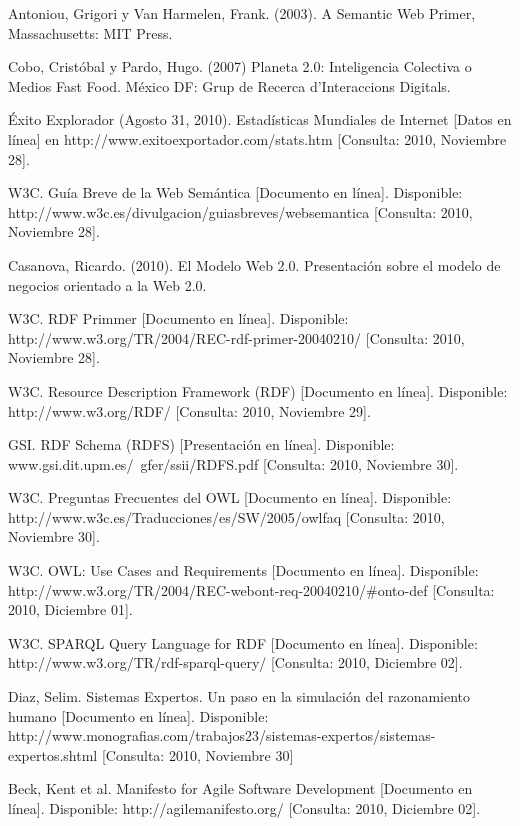 \begin{thebibliography}{20}

 Antoniou, Grigori y Van Harmelen, Frank. (2003). A Semantic Web Primer, Massachusetts: MIT Press.

 Cobo, Cristóbal y Pardo, Hugo. (2007) Planeta 2.0: Inteligencia Colectiva o Medios Fast Food. México DF: Grup de Recerca d'Interaccions Digitals.

 Éxito Explorador (Agosto 31, 2010). Estadísticas Mundiales de Internet [Datos en línea] en http://www.exitoexportador.com/stats.htm [Consulta: 2010, Noviembre 28].

 W3C. Guía Breve de la Web Semántica [Documento en línea]. Disponible: http://www.w3c.es/divulgacion/guiasbreves/websemantica [Consulta: 2010, Noviembre 28].

 Casanova, Ricardo. (2010). El Modelo Web 2.0. Presentación sobre el modelo de negocios orientado a la Web 2.0.

 W3C. RDF Primmer [Documento en línea]. Disponible: http://www.w3.org/TR/2004/REC-rdf-primer-20040210/ [Consulta: 2010, Noviembre 28].

 W3C. Resource Description Framework (RDF) [Documento en línea]. Disponible: http://www.w3.org/RDF/ [Consulta: 2010, Noviembre 29].

 GSI. RDF Schema (RDFS) [Presentación en línea]. Disponible: www.gsi.dit.upm.es/~gfer/ssii/RDFS.pdf [Consulta: 2010, Noviembre 30].

 W3C. Preguntas Frecuentes del OWL [Documento en línea]. Disponible: http://www.w3c.es/Traducciones/es/SW/2005/owlfaq [Consulta: 2010, Noviembre 30].

 W3C. OWL: Use Cases and Requirements [Documento en línea]. Disponible: http://www.w3.org/TR/2004/REC-webont-req-20040210/\#onto-def [Consulta: 2010, Diciembre 01].

 W3C. SPARQL Query Language for RDF [Documento en línea]. Disponible: http://www.w3.org/TR/rdf-sparql-query/ [Consulta: 2010, Diciembre 02].

 Diaz, Selim. Sistemas Expertos. Un paso en la simulación del razonamiento humano [Documento en línea]. Disponible: http://www.monografias.com/trabajos23/sistemas-expertos/sistemas-expertos.shtml [Consulta: 2010, Noviembre 30]

 Beck, Kent et al. Manifesto for Agile Software Development [Documento en línea]. Disponible: http://agilemanifesto.org/ [Consulta: 2010, Diciembre 02].


\end{thebibliography}
